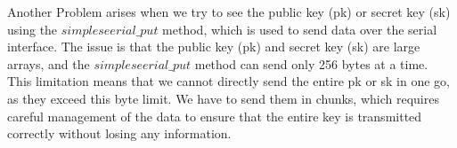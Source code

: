 Another Problem arises when we try to see the public key (pk) or secret key (sk) using the $simpleseerial\_put$ method, which is used to send data over the serial interface. The issue is that the public key (pk) and secret key (sk) are large arrays, and the $simpleseerial\_put$ method can send only 256 bytes at a time. This limitation means that we cannot directly send the entire pk or sk in one go, as they exceed this byte limit. We have to send them in chunks, which requires careful management of the data to ensure that the entire key is transmitted correctly without losing any information. 